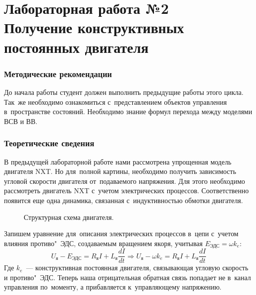 \documentclass[12pt,a4paper,openany]{extarticle}
\begin{document}
\part*{Лабораторная работа №2\\
Получение конструктивных постоянных двигателя}
\section{Методические рекомендации}
До начала работы студент должен выполнить предыдущие работы этого цикла. Так~же необходимо ознакомиться с~представлением объектов управления в~пространстве состояний. Необходимо знание формул перехода между моделями ВСВ и ВВ.
\section{Теоретические сведения}
В предыдущей лабораторной работе нами рассмотрена упрощенная модель двигателя NXT. Но для~полной картины, необходимо получить зависимость угловой скорости двигателя от~подаваемого напряжения.
Для этого необходимо рассмотреть двигатель NXT с~учетом электрических процессов. Соответственно появится еще одна динамика, связанная с~индуктивностью обмотки двигателя. 

\begin{figure}[H]
	\noindent{}
	\caption{Структурная схема двигателя.}
	\label{fig:engine_struct}
\end{figure}

Запишем уравнение для~описания электрических процессов в~цепи с~учетом влияния противо"~ЭДС, создаваемым вращением якоря, учитывая $E_\textit{ЭДС}=\omega k_e$:
\begin{equation}
U_\textit{я}-E_\textit{ЭДС}=R_\textit{я}I+L_\textit{я}\frac{dI}{dt}\Rightarrow U_\textit{я}-\omega k_e=R_\textit{я}I+L_\textit{я}\frac{dI}{dt}
\end{equation}
Где $k_e$~--- конструктивная постоянная двигателя, связывающая угловую скорость и противо"~ЭДС. Теперь наша отрицательная обратная связь попадает не в~канал управления по~моменту, а прибавляется к~управляющему напряжению.
\end{document}
